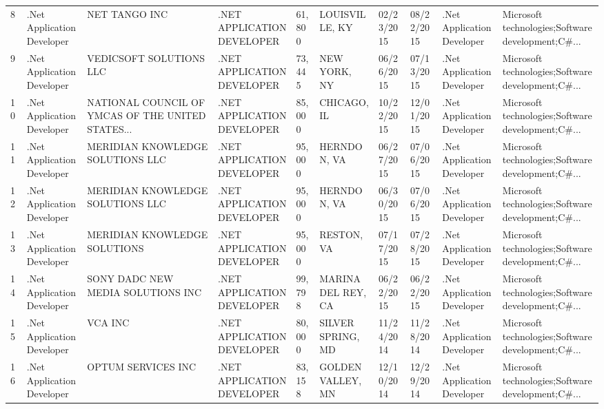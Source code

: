 \begin{table}[h!]
{\begin{tabular}{llllllllll}
	8  &  .Net Application Developer &                                      NET TANGO INC &  .NET APPLICATION DEVELOPER &      61,800 &      LOUISVILLE, KY &  02/23/2015 &  08/22/2015 &  .Net Application Developer &  Microsoft technologies;Software development;C\#... \\
	9  &  .Net Application Developer &                            VEDICSOFT SOLUTIONS LLC &  .NET APPLICATION DEVELOPER &      73,445 &        NEW YORK, NY &  06/26/2015 &  07/13/2015 &  .Net Application Developer &  Microsoft technologies;Software development;C\#... \\
	10 &  .Net Application Developer &  NATIONAL COUNCIL OF YMCAS OF THE UNITED STATES... &  .NET APPLICATION DEVELOPER &      85,000 &         CHICAGO, IL &  10/22/2015 &  12/01/2015 &  .Net Application Developer &  Microsoft technologies;Software development;C\#... \\
	11 &  .Net Application Developer &                   MERIDIAN KNOWLEDGE SOLUTIONS LLC &  .NET APPLICATION DEVELOPER &      95,000 &         HERNDON, VA &  06/27/2015 &  07/06/2015 &  .Net Application Developer &  Microsoft technologies;Software development;C\#... \\
	12 &  .Net Application Developer &                   MERIDIAN KNOWLEDGE SOLUTIONS LLC &  .NET APPLICATION DEVELOPER &      95,000 &         HERNDON, VA &  06/30/2015 &  07/06/2015 &  .Net Application Developer &  Microsoft technologies;Software development;C\#... \\
	13 &  .Net Application Developer &                       MERIDIAN KNOWLEDGE SOLUTIONS &  .NET APPLICATION DEVELOPER &      95,000 &          RESTON, VA &  07/17/2015 &  07/28/2015 &  .Net Application Developer &  Microsoft technologies;Software development;C\#... \\
	14 &  .Net Application Developer &                  SONY DADC NEW MEDIA SOLUTIONS INC &  .NET APPLICATION DEVELOPER &      99,798 &  MARINA DEL REY, CA &  06/22/2015 &  06/22/2015 &  .Net Application Developer &  Microsoft technologies;Software development;C\#... \\
	15 &  .Net Application Developer &                                            VCA INC &  .NET APPLICATION DEVELOPER &      80,000 &   SILVER SPRING, MD &  11/24/2014 &  11/28/2014 &  .Net Application Developer &  Microsoft technologies;Software development;C\#... \\
	16 &  .Net Application Developer &                                 OPTUM SERVICES INC &  .NET APPLICATION DEVELOPER &      83,158 &   GOLDEN VALLEY, MN &  12/10/2014 &  12/29/2014 &  .Net Application Developer &  Microsoft technologies;Software development;C\#... \\

\end{tabular}}
\end{table}
